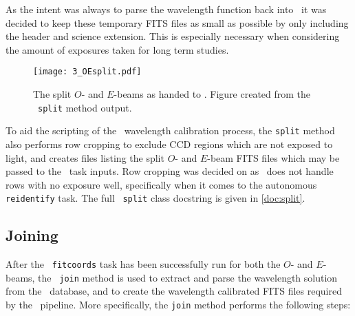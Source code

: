 As the intent was always to parse the wavelength function back into \polsalt\ it was decided to keep these temporary \gls{FITS} files as small as possible by only including the header and science extension. This is especially necessary when considering the amount of exposures taken for long term studies. %

\begin{figure}[t]
    \centering
    \texttt{[image: 3\_OEsplit.pdf]}
    \caption{The split $O$- and $E$-beams as handed to \iraf. Figure created from the \stops\ \texttt{split} method output.}
    \label{fig:OE_split}
\end{figure}

To aid the scripting of the \iraf\ wavelength calibration process, the \texttt{split} method also performs row cropping to exclude \gls{CCD} regions which are not exposed to light, and creates files listing the split $O$- and $E$-beam \gls{FITS} files which may be passed to the \iraf\ task inputs. Row cropping was decided on as \iraf\ does not handle rows with no exposure well, specifically when it comes to the autonomous \texttt{reidentify} task.
The full \stops\ \texttt{split} class docstring is given in \autoref{doc:split}.

\subsection{Joining} \label{subsec:stops_join}



After the \iraf\ \texttt{fitcoords} task has been successfully run for both the $O$- and $E$-beams, the \stops\ \texttt{join} method is used to extract and parse the wavelength solution from the \iraf\ database, and to create the wavelength calibrated \gls{FITS} files required by the \polsalt\ pipeline. More specifically, the \texttt{join} method performs the following steps:

